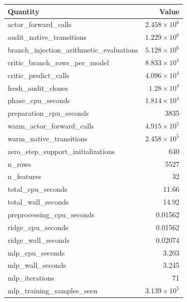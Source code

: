 \begin{tabular}{lr}
\toprule
Quantity & Value \\
\midrule
actor\_forward\_calls & \(2.458\times10^{6}\) \\
audit\_native\_transitions & \(1.229\times10^{6}\) \\
branch\_injection\_arithmetic\_evaluations & \(5.128\times10^{6}\) \\
critic\_branch\_rows\_per\_model & \(8.833\times10^{4}\) \\
critic\_predict\_calls & \(4.096\times10^{4}\) \\
fresh\_audit\_clones & \(1.28\times10^{4}\) \\
phase\_cpu\_seconds & \(1.814\times10^{4}\) \\
preparation\_cpu\_seconds & 3835 \\
warm\_actor\_forward\_calls & \(4.915\times10^{5}\) \\
warm\_native\_transitions & \(2.458\times10^{5}\) \\
zero\_step\_support\_initializations & 640 \\
n\_rows & 5527 \\
n\_features & 32 \\
total\_cpu\_seconds & 11.66 \\
total\_wall\_seconds & 14.92 \\
preprocessing\_cpu\_seconds & 0.01562 \\
ridge\_cpu\_seconds & 0.01562 \\
ridge\_wall\_seconds & 0.02074 \\
mlp\_cpu\_seconds & 3.203 \\
mlp\_wall\_seconds & 3.245 \\
mlp\_iterations & 71 \\
mlp\_training\_samples\_seen & \(3.139\times10^{5}\) \\
\bottomrule
\end{tabular}
